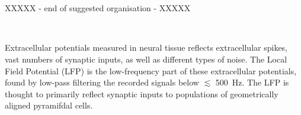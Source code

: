 \subsection{}

\subsection{}

\subsection{}


\section{}

\subsection{}

\subsection{}

\section{}

\subsection{}

\noindent
XXXXX - end of suggested organisation - XXXXX

\


Extracellular potentials measured in neural tissue reflects extracellular spikes, vast numbers of synaptic inputs, as well as different types of noise. The Local Field Potential (LFP) is the low-frequency part of these extracellular potentials, found by low-pass filtering the recorded signals below $\lesssim$ 500~Hz. The LFP is thought to primarily reflect synaptic inputs to populations of geometrically aligned pyramifdal cells.

